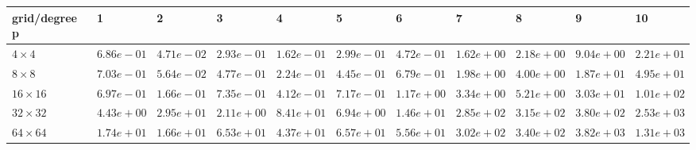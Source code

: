 \begin{tabular}{lllllllllll}
\hline
 grid/degree p   & 1          & 2          & 3          & 4          & 5          & 6          & 7          & 8          & 9          & 10         \\
\hline
 $4 \times 4$    & $6.86e-01$ & $4.71e-02$ & $2.93e-01$ & $1.62e-01$ & $2.99e-01$ & $4.72e-01$ & $1.62e+00$ & $2.18e+00$ & $9.04e+00$ & $2.21e+01$ \\
 $8 \times 8$    & $7.03e-01$ & $5.64e-02$ & $4.77e-01$ & $2.24e-01$ & $4.45e-01$ & $6.79e-01$ & $1.98e+00$ & $4.00e+00$ & $1.87e+01$ & $4.95e+01$ \\
 $16 \times 16$  & $6.97e-01$ & $1.66e-01$ & $7.35e-01$ & $4.12e-01$ & $7.17e-01$ & $1.17e+00$ & $3.34e+00$ & $5.21e+00$ & $3.03e+01$ & $1.01e+02$ \\
 $32 \times 32$  & $4.43e+00$ & $2.95e+01$ & $2.11e+00$ & $8.41e+01$ & $6.94e+00$ & $1.46e+01$ & $2.85e+02$ & $3.15e+02$ & $3.80e+02$ & $2.53e+03$ \\
 $64 \times 64$  & $1.74e+01$ & $1.66e+01$ & $6.53e+01$ & $4.37e+01$ & $6.57e+01$ & $5.56e+01$ & $3.02e+02$ & $3.40e+02$ & $3.82e+03$ & $1.31e+03$ \\
\hline
\end{tabular}